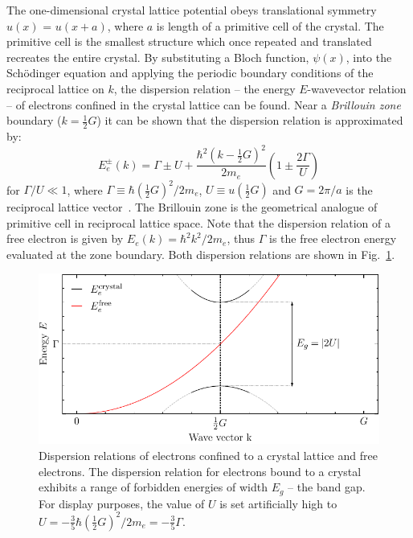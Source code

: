 The one-dimensional crystal lattice potential obeys translational symmetry $u(x)$ = $u(x + a)$, where $a$ is length of a primitive cell of the crystal. The primitive cell is the smallest structure which once repeated and translated recreates the entire crystal. By substituting a Bloch function, $\psi(x)$, into the Sch\"odinger equation and applying the periodic boundary conditions of the reciprocal lattice on $k$, the dispersion relation -- the energy $E$-wavevector relation -- of electrons confined in the crystal lattice can be found. Near a \textit{Brillouin zone} boundary ($k = \frac{1}{2}G$) it can be shown that the dispersion relation is approximated by:
\begin{equation}
	E_e^\pm(k) =  \Gamma \pm U + \frac{\hbar^2\left(k-\frac{1}{2}G\right)^2}{2m_e}\left(1 \pm \frac{2\Gamma}{U}\right)
	\label{eq:dispersion_crystal}
\end{equation}
for $\Gamma/U \ll 1$, where $\Gamma \equiv \hbar\left(\frac{1}{2}G\right)^2/2m_e$, $U \equiv u\left(\frac{1}{2}G\right)$ and $G = 2\pi/a$ is the reciprocal lattice vector~\cite{kittel}. The Brillouin zone is the geometrical analogue of primitive cell in reciprocal lattice space. Note that the dispersion relation of a free electron is given by $E_e(k) = \hbar^2k^2/2m_e$, thus $\Gamma$ is the free electron energy evaluated at the zone boundary. Both dispersion relations are shown in Fig.~\ref{fig:bandgap}.
\begin{figure}[htb]
	\centering
	\includegraphics[width=5in]{figs/ge/band_gap_width_5in.pdf}
	\caption{Dispersion relations of electrons confined to a crystal lattice and free electrons. The dispersion relation for electrons bound to a crystal exhibits a range of forbidden energies of width $E_g$ -- the band gap. For display purposes, the value of $U$ is set artificially high to $U=-\frac{3}{5}\hbar\left(\frac{1}{2}G\right)^2/2m_e =-\frac{3}{5}\Gamma$.} 
	\label{fig:bandgap}
\end{figure}

